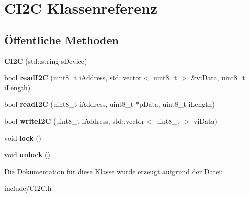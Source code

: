 \hypertarget{class_c_i2_c}{\section{\-C\-I2\-C \-Klassenreferenz}
\label{class_c_i2_c}
}
\subsection*{Öffentliche \-Methoden}
\begin{DoxyCompactItemize}
\item 
\hypertarget{class_c_i2_c_af9cef7b8b62fb72dddd51245d3786be9}{{\bfseries \-C\-I2\-C} (std\-::string s\-Device)}\label{class_c_i2_c_af9cef7b8b62fb72dddd51245d3786be9}

\item 
\hypertarget{class_c_i2_c_a21a55c4858eb4d6da5c0d1df2e1ef967}{bool {\bfseries read\-I2\-C} (uint8\-\_\-t i\-Address, std\-::vector$<$ uint8\-\_\-t $>$ \&vi\-Data, uint8\-\_\-t i\-Length)}\label{class_c_i2_c_a21a55c4858eb4d6da5c0d1df2e1ef967}

\item 
\hypertarget{class_c_i2_c_a8a682335fedaf77db37a87746093e52a}{bool {\bfseries read\-I2\-C} (uint8\-\_\-t i\-Address, uint8\-\_\-t $\ast$p\-Data, uint8\-\_\-t i\-Length)}\label{class_c_i2_c_a8a682335fedaf77db37a87746093e52a}

\item 
\hypertarget{class_c_i2_c_a156ab3c09f2cc4d17febd438711be8ec}{bool {\bfseries write\-I2\-C} (uint8\-\_\-t i\-Address, std\-::vector$<$ uint8\-\_\-t $>$ vi\-Data)}\label{class_c_i2_c_a156ab3c09f2cc4d17febd438711be8ec}

\item 
\hypertarget{class_c_i2_c_adef76d15cf343ebce8b11d0db95215d9}{void {\bfseries lock} ()}\label{class_c_i2_c_adef76d15cf343ebce8b11d0db95215d9}

\item 
\hypertarget{class_c_i2_c_a19407b97ee07c3a99df9f32a032549c3}{void {\bfseries unlock} ()}\label{class_c_i2_c_a19407b97ee07c3a99df9f32a032549c3}

\end{DoxyCompactItemize}


\-Die \-Dokumentation für diese \-Klasse wurde erzeugt aufgrund der \-Datei\-:\begin{DoxyCompactItemize}
\item 
include/\-C\-I2\-C.\-h\end{DoxyCompactItemize}
